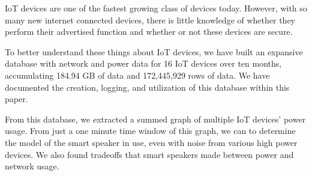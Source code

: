 IoT devices are one of the fastest growing class of devices today. However, with so many new internet connected devices, there is little knowledge of whether they perform their advertised function and whether or not these devices are secure.

To better understand these things about IoT devices, we have built an expansive database with network and power data for 16 IoT devices over ten months, accumulating 184.94 GB of data and 172,445,929 rows of data. We have documented the creation, logging, and utilization of this database within this paper.

From this database, we extracted a summed graph of multiple IoT devices' power usage. From just a one minute time window of this graph, we can to determine the model of the smart speaker in use, even with noise from various high power devices. We also found tradeoffs that smart speakers made between power and network usage.


